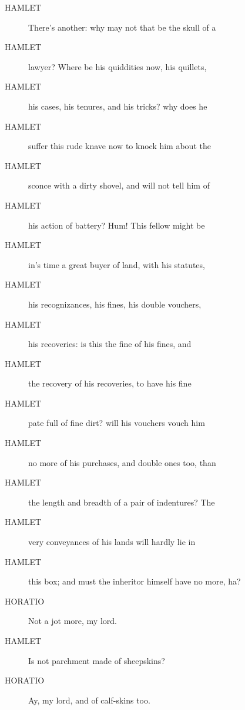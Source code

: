 \documentclass{article}
\begin{document}
\begin{description}
            
\item[HAMLET] There's another: why may not that be the skull of a
\item[HAMLET] lawyer? Where be his quiddities now, his quillets,
\item[HAMLET] his cases, his tenures, and his tricks? why does he
\item[HAMLET] suffer this rude knave now to knock him about the
\item[HAMLET] sconce with a dirty shovel, and will not tell him of
\item[HAMLET] his action of battery? Hum! This fellow might be
\item[HAMLET] in's time a great buyer of land, with his statutes,
\item[HAMLET] his recognizances, his fines, his double vouchers,
\item[HAMLET] his recoveries: is this the fine of his fines, and
\item[HAMLET] the recovery of his recoveries, to have his fine
\item[HAMLET] pate full of fine dirt? will his vouchers vouch him
\item[HAMLET] no more of his purchases, and double ones too, than
\item[HAMLET] the length and breadth of a pair of indentures? The
\item[HAMLET] very conveyances of his lands will hardly lie in
\item[HAMLET] this box; and must the inheritor himself have no more, ha?
\end{description}
          
\begin{description}
            
\item[HORATIO] Not a jot more, my lord.
\end{description}
          
\begin{description}
            
\item[HAMLET] Is not parchment made of sheepskins?
\end{description}
          
\begin{description}
            
\item[HORATIO] Ay, my lord, and of calf-skins too.
\end{description}
          
\end{document}
